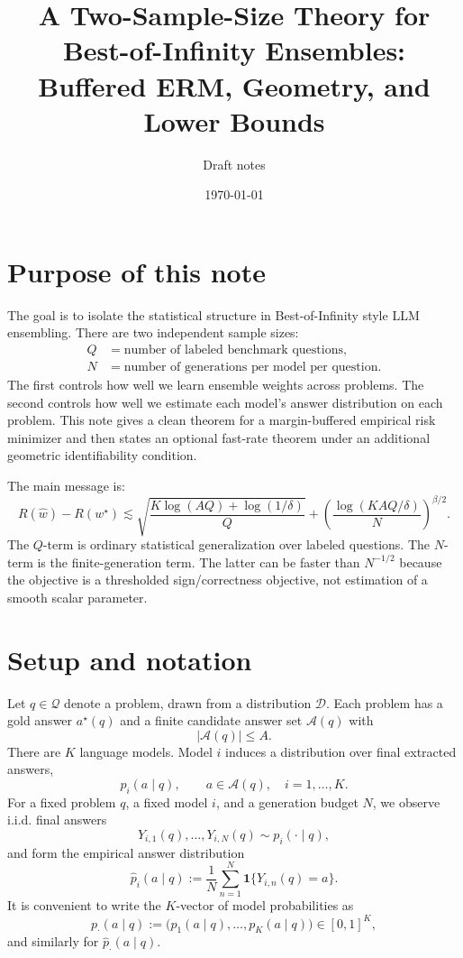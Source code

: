 \documentclass[11pt]{article}
\title{A Two-Sample-Size Theory for Best-of-Infinity Ensembles:\\ Buffered ERM, Geometry, and Lower Bounds}
\author{Draft notes}
\date{\today}
\newcommand{\Q}{\mathcal Q}
\newcommand{\A}{\mathcal A}
\newcommand{\D}{\mathcal D}
\newcommand{\one}{\mathbf 1}
\newcommand{\what}{\widehat w}
\newcommand{\wstar}{w^\star}
\begin{document}
\maketitle

\section{Purpose of this note}

The goal is to isolate the statistical structure in Best-of-Infinity style LLM ensembling.  There are two independent sample sizes:
\[
\begin{aligned}
Q &= \text{number of labeled benchmark questions},\\
N &= \text{number of generations per model per question}.
\end{aligned}
\]
The first controls how well we learn ensemble weights across problems.  The second controls how well we estimate each model's answer distribution on each problem.  This note gives a clean theorem for a margin-buffered empirical risk minimizer and then states an optional fast-rate theorem under an additional geometric identifiability condition.

The main message is:
\[
\boxed{
R(\what)-R(\wstar)
\lesssim
\sqrt{\frac{K\log(AQ)+\log(1/\delta)}{Q}}
+
\left(\frac{\log(KAQ/\delta)}{N}\right)^{\beta/2}.}
\]
The $Q$-term is ordinary statistical generalization over labeled questions.  The $N$-term is the finite-generation term.  The latter can be faster than $N^{-1/2}$ because the objective is a thresholded sign/correctness objective, not estimation of a smooth scalar parameter.

\section{Setup and notation}

Let $q\in\Q$ denote a problem, drawn from a distribution $\D$.  Each problem has a gold answer $a^\star(q)$ and a finite candidate answer set $\A(q)$ with
\[
|\A(q)|\le A.
\]
There are $K$ language models.  Model $i$ induces a distribution over final extracted answers,
\[
p_i(a\mid q),\qquad a\in\A(q),\quad i=1,\dots,K.
\]
For a fixed problem $q$, a fixed model $i$, and a generation budget $N$, we observe i.i.d. final answers
\[
Y_{i,1}(q),\dots,Y_{i,N}(q)\sim p_i(\cdot\mid q),
\]
and form the empirical answer distribution
\[
\widehat p_i(a\mid q)
:=
\frac1N\sum_{n=1}^N \one\{Y_{i,n}(q)=a\}.
\]
It is convenient to write the $K$-vector of model probabilities as
\[
p_\cdot(a\mid q)
:=
\big(p_1(a\mid q),\dots,p_K(a\mid q)\big)\in[0,1]^K,
\]
and similarly for $\widehat p_\cdot(a\mid q)$.
\end{document}
